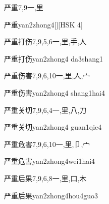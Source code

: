 \begin{Entry}{严重}{7,9}{⼀,⾥}
  \begin{Phonetics}{严重}{yan2zhong4}[][HSK 4]
  \end{Phonetics}
\end{Entry}

\begin{Entry}{严重打伤}{7,9,5,6}{⼀,⾥,⼿,⼈}
  \begin{Phonetics}{严重打伤}{yan2zhong4 da3shang1}
  \end{Phonetics}
\end{Entry}

\begin{Entry}{严重伤害}{7,9,6,10}{⼀,⾥,⼈,⼧}
  \begin{Phonetics}{严重伤害}{yan2zhong4 shang1hai4}
  \end{Phonetics}
\end{Entry}

\begin{Entry}{严重关切}{7,9,6,4}{⼀,⾥,⼋,⼑}
  \begin{Phonetics}{严重关切}{yan2zhong4 guan1qie4}
  \end{Phonetics}
\end{Entry}

\begin{Entry}{严重危害}{7,9,6,10}{⼀,⾥,⼙,⼧}
  \begin{Phonetics}{严重危害}{yan2zhong4wei1hai4}
  \end{Phonetics}
\end{Entry}

\begin{Entry}{严重后果}{7,9,6,8}{⼀,⾥,⼝,⽊}
  \begin{Phonetics}{严重后果}{yan2zhong4hou4guo3}
  \end{Phonetics}
\end{Entry}

